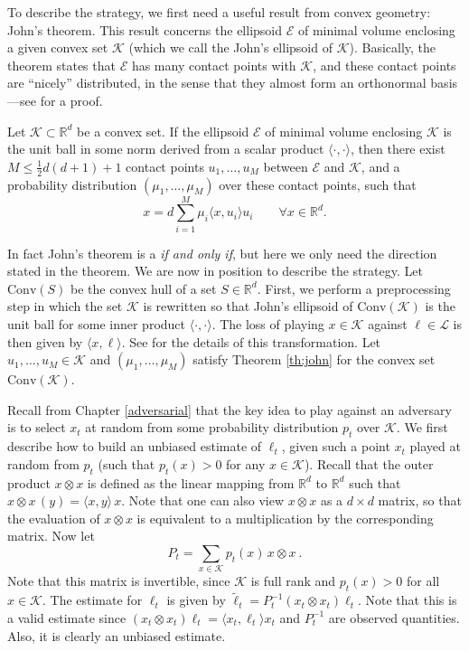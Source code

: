 \documentclass[11pt]{hackednow}
\newcommand{\R}{\mathbb{R}}
\newcommand{\cL}{\mathcal{L}}
\newcommand{\cE}{\mathcal{E}}
\newcommand{\cK}{\mathcal{K}}
\renewcommand{\tilde}{\widetilde}
\newcommand{\conv}{\mathrm{Conv}}
\begin{document}
To describe the strategy, we first need a useful result from convex geometry: John's theorem. This result concerns the ellipsoid $\cE$ of minimal volume enclosing a given convex set $\cK$ (which we call the John's ellipsoid of $\cK$). Basically, the theorem states that $\cE$ has many contact points with $\cK$, and these contact points are ``nicely'' distributed, in the sense that they almost form an orthonormal basis ---see \cite{Bal97} for a proof.
\begin{theorem} \label{th:john}
Let $\cK \subset \R^d$ be a convex set. If the ellipsoid $\cE$ of minimal volume enclosing $\cK$ is the unit ball in some norm derived from a scalar product $\langle \cdot, \cdot \rangle$, then there exist $M \leq \tfrac{1}{2}d(d+1) + 1$ contact points $u_1, \hdots, u_M$ between $\cE$ and $\cK$, and a probability distribution $(\mu_1,\dots,\mu_M)$ over these contact points, such that
$$x = d \sum_{i=1}^M \mu_i \langle x, u_i \rangle u_i \qquad \forall x \in \R^d .$$
\end{theorem}
In fact John's theorem is a {\em if and only if}, but here we only need the direction stated in the theorem. 
We are now in position to describe the strategy. Let $\conv(S)$ be the convex hull of a set $S\in\R^d$. First, we perform a preprocessing step in which the set $\cK$ is rewritten so that John's ellipsoid of $\conv(\cK)$ is the unit ball for some inner product $\langle \cdot, \cdot \rangle$. The loss of playing $x \in \cK$ against $\ell \in \cL$ is then given by $\langle x, \ell \rangle$. See \cite{BCK12} for the details of this transformation. Let $u_1, \hdots, u_M \in \cK$ and $(\mu_1,\dots,\mu_M)$ satisfy Theorem \ref{th:john} for the convex set $\conv(\cK)$.

Recall from Chapter \ref{adversarial} that the key idea to play against an adversary is to select $x_t$ at random from some probability distribution $p_t$ over $\cK$. We first describe how to build an unbiased estimate of $\ell_t$, given such a point $x_t$ played at random from $p_t$ (such that $p_t(x) > 0$  for any $x \in \cK$). Recall that the outer product $x \otimes x$ is defined as the linear mapping from $\R^d$ to $\R^d$ such that $x \otimes x\, (y) = \langle x, y \rangle\, x$. Note that one can also view $x \otimes x$ as a $d \times d$ matrix, so that the evaluation of $x \otimes x$ is equivalent to a multiplication by the corresponding matrix. Now let
$$P_t = \sum_{x \in \cK} {p}_t(x)\, x \otimes x~.$$
Note that this matrix is invertible, since $\cK$ is full rank and $p_t(x) > 0$ for all $x \in \cK$. The estimate for $\ell_t$ is given by
$
\tilde{\ell}_t = P_t^{-1} \left(x_t \otimes x_t\right) \ell_t
$.
Note that this is a valid estimate since $\left(x_t \otimes x_t\right) \ell_t = \langle x_t, \ell_t \rangle x_t$ and $P_t^{-1}$ are observed quantities. Also, it is clearly an unbiased estimate.
 
\end{document}
